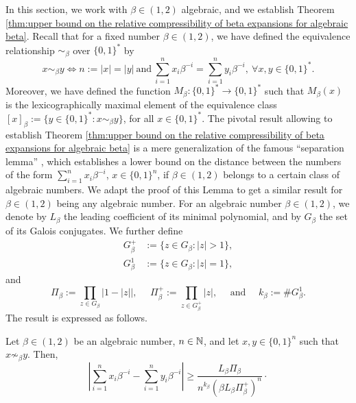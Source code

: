 In this section, we work with $\beta \in (1,2)$ algebraic, and we establish Theorem \ref{thm:upper bound on the relative compressibility of beta expansions for algebraic beta}. Recall that for a fixed number $\beta \in (1,2)$, we have defined the equivalence relationship $\sim_\beta$ over $\{0,1\}^\ast$ by 
\begin{equation}
    x \sim_\beta y \iff n := |x| = |y| \ \text{and} \ \sum_{i=1}^n x_i \beta^{-i} = \sum_{i=1}^n y_i \beta^{-i}, \ \forall x,y \in \{0,1\}^\ast.
\end{equation}
Moreover, we have defined the function $M_\beta : \{0,1\}^\ast \to \{0,1\}^\ast$ such that $M_\beta(x)$ is the lexicographically maximal element of the equivalence class $[x]_\beta := \{y \in \{0,1\}^\ast : x \sim_\beta y\}$, for all $x \in \{0,1\}^\ast$. The pivotal result allowing to establish Theorem \ref{thm:upper bound on the relative compressibility of beta expansions for algebraic beta} is a mere generalization of the famous ``separation lemma'' \cite[Lemma 1.51]{garsia1962ArithmeticPropertiesBernoulli}, which establishes a lower bound on the distance between the numbers of the form $\sum_{i=1}^n x_i \beta^{-i}$, $x \in \{0,1\}^n$, if $\beta \in (1,2)$ belongs to a certain class of algebraic numbers. We adapt the proof of this Lemma to get a similar result for $\beta \in (1,2)$ being any algebraic number. For an algebraic number $\beta \in (1,2)$, we denote by $L_\beta$ the leading coefficient of its minimal polynomial, and by $G_\beta$ the set of its Galois conjugates. We further define 
\begin{align}
    G_\beta^+ &:= \{ z \in G_\beta : |z| > 1\},\\
    G_\beta^1 &:= \{ z \in G_\beta : |z| = 1\},
\end{align}
and
\begin{equation}\label{eq:definition of pi beta - pi beta + and k beta}
    \Pi_\beta := \prod_{z \in G_\beta} |1-|z||, \ \ \ \ \ \ \Pi_\beta^+ := \prod_{z \in G_\beta^+} |z|, \ \ \ \ \ \ \text{and} \ \ \ \ \ \ k_\beta := \# G_\beta^1.
\end{equation}
The result is expressed as follows.
\begin{lemma}\label{lem:generalization of the garsia separation lemma}
    Let $\beta \in (1,2)$ be an algebraic number, $n \in \mathbb{N}$, and let $x,y \in \{0,1\}^n$ such that $x \not\sim_\beta y$. Then,
    \begin{equation}
       \left|\sum_{i=1}^n x_i \beta^{-i} - \sum_{i=1}^n y_i \beta^{-i}\right| \geq \frac{L_\beta\Pi_\beta}{\displaystyle  n^{k_\beta}\left(\beta L_\beta \Pi_\beta^+ \right)^n}\cdot
    \end{equation}
\end{lemma}
